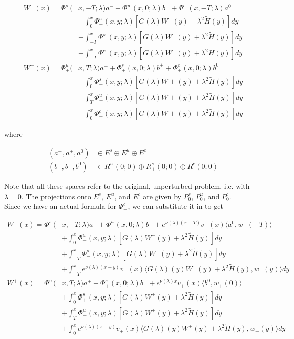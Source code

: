 \documentclass[12pt]{article}
\begin{document}
\begin{align*}
W^-(x) = \Phi^s_-(&x, -T; \lambda)a^- + \Phi^u_-(x, 0; \lambda)b^- + \Phi^c_-(x, -T; \lambda)a^0 \\
&+ \int_0^x \Phi^u_-(x, y; \lambda)[ G(\lambda)W^-(y) + \lambda^2 \tilde{H}(y) ] dy \\
&+ \int_{-T}^x \Phi^s_-(x, y; \lambda) [ G(\lambda)W^-(y) + \lambda^2 \tilde{H}(y) ] dy \\
&+ \int_{-T}^x \Phi^c_-(x, y; \lambda) [ G(\lambda)W^-(y) + \lambda^2 \tilde{H}(y) ]dy \\
W^+(x) = \Phi^u_+(&x, T; \lambda)a^+ + \Phi^s_+(x, 0; \lambda)b^+ + \Phi^c_+(x, 0; \lambda)b^0 \\
&+ \int_0^x \Phi^s_+(x, y; \lambda) [ G(\lambda)W+(y) + \lambda^2 \tilde{H}(y) ] dy \\
&+ \int_T^x \Phi^u_+(x, y; \lambda) [ G(\lambda)W+(y) + \lambda^2 \tilde{H}(y) ] dy \\
&+ \int_0^x \Phi^c_+(x, y; \lambda) [ G(\lambda)W+(y) + \lambda^2 \tilde{H}(y) ] dy
\end{align*}

where

\begin{align*}
(a^-, a^+, a^0) &\in E^s \oplus E^u \oplus E^c \\
(b^-, b^+, b^0) &\in R^u_-(0; 0) \oplus R^s_+(0; 0) \oplus R^c(0; 0)
\end{align*}

Note that all these spaces refer to the original, unperturbed problem, i.e. with $\lambda = 0$. The projections onto $E^s$, $E^u$, and $E^c$ are given by $P_0^s$, $P_0^u$, and $P_0^c$.\\

Since we have an actual formula for $\Phi^c_\pm$, we can substitute it in to get

\begin{align*}
W^-(x) = \Phi^s_-(&x, -T; \lambda)a^- + \Phi^u_-(x, 0; \lambda)b^- + e^{\nu(\lambda)(x+T)} v_-(x) \langle a^0, w_-(-T) \rangle \\
&+ \int_0^x \Phi^u_-(x, y; \lambda)[ G(\lambda)W^-(y) + \lambda^2 \tilde{H}(y) ] dy \\
&+ \int_{-T}^x \Phi^s_-(x, y; \lambda) [ G(\lambda)W^-(y) + \lambda^2 \tilde{H}(y) ] dy \\
&+ \int_{-T}^x 
e^{\nu(\lambda)(x-y)} v_-(x) \langle G(\lambda)(y)W^-(y) + \lambda^2 \tilde{H}(y), w_-(y) \rangle dy \\
W^+(x) = \Phi^u_+(&x, T; \lambda)a^+ + \Phi^s_+(x, 0; \lambda)b^+ + e^{\nu(\lambda)x} v_+(x) \langle b^0, w_+(0) \rangle \\
&+ \int_0^x \Phi^s_+(x, y; \lambda) [ G(\lambda)W^+(y) + \lambda^2 \tilde{H}(y) ] dy \\
&+ \int_T^x \Phi^u_+(x, y; \lambda) [ G(\lambda)W^+(y) + \lambda^2 \tilde{H}(y) ] dy \\
&+ \int_0^x e^{\nu(\lambda)(x-y)} v_+(x) \langle G(\lambda)(y)W^+(y) + \lambda^2 \tilde{H}(y), w_+(y) \rangle dy
\end{align*}
\end{document}
